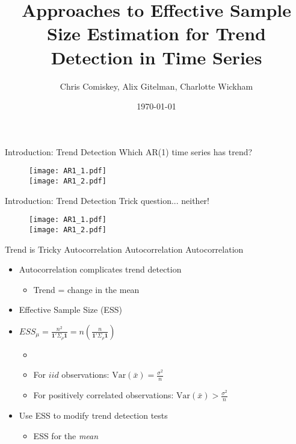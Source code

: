 \documentclass{beamer}
\title[Approaches to Effective Sample Size Estimation]{Approaches to Effective Sample Size Estimation for Trend Detection in Time Series}
\author{Chris Comiskey, Alix Gitelman, Charlotte Wickham}
\institute{Oregon State University}
\date{\today}
\begin{document}
\begin{frame}
  \titlepage
\end{frame}


\begin{frame}{Introduction: Trend Detection}{} %
Which AR(1) time series has trend? \\
	\begin{figure}[] 
	\centering
	\texttt{[image: AR1\_1.pdf]} \\
 	\texttt{[image: AR1\_2.pdf]}
	\end{figure}
\end{frame}


\begin{frame}{Introduction: Trend Detection}{} %
Trick question... neither! \\
	\begin{figure}[] 
	\centering
	\texttt{[image: AR1\_1.pdf]} \\
 	\texttt{[image: AR1\_2.pdf]}
	\end{figure}
\end{frame}



\begin{frame}{Trend is Tricky}{}  %
{\Large Autocorrelation Autocorrelation Autocorrelation} \\

\begin{itemize}
\item Autocorrelation complicates trend detection
	\begin{itemize}
	\item Trend = change in the mean
	\end{itemize}
\item Effective Sample Size (ESS)
\item $ESS_{\mu}  = \frac{n^{2}}{\mathbf{1}'\Sigma_{\rho} \mathbf{1}} = n \left( \frac{n}{\mathbf{1}'\Sigma_{\rho} \mathbf{1}} \right)$
	\begin{itemize}
	\item \cite{HB46}
	\item For $iid$ observations: $\text{Var}(\bar{x}) = \frac{\sigma^{2}}{n}$
	\item For positively correlated observations: $\text{Var}(\bar{x}) > \frac{\sigma^{2}}{n}$
	\end{itemize}
\item Use ESS to modify trend detection tests
	\begin{itemize}
	\item ESS for the \textit{mean}
	\end{itemize}

\end{itemize}
\end{frame}
\end{document}
